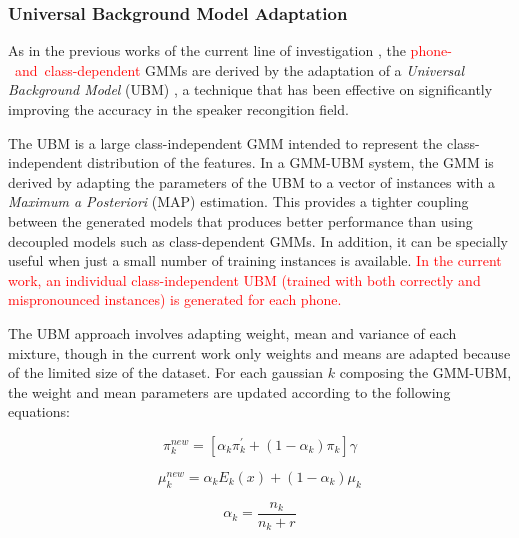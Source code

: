 
\subsubsection{Universal Background Model Adaptation} \label{subsubsection:ubm}

As in the previous works of the current line of investigation
\cite{detection_phone_level_mispronunciation_learning, main},
the \mbox{\textcolor{red}{phone- and class-dependent}} GMMs are derived by the adaptation of a
\textit{Universal Background Model} (UBM)
\cite{ubm_adaptation}, a technique that has been effective on significantly improving
the accuracy in the speaker recongition field.

The UBM is a large class-independent GMM intended to represent the class-independent distribution
of the features. In a GMM-UBM system, the GMM is derived by adapting the parameters of the UBM
to a vector of instances with a \textit{Maximum a Posteriori} (MAP) estimation. This provides a
tighter coupling between the generated models that produces better performance than using
decoupled models such as class-dependent GMMs. In addition, it can be specially useful when
just a small number of training instances is available.
\textcolor{red}{In the current work, an individual
class-independent UBM (trained with both correctly and mispronounced instances)
is generated for each phone.}

The UBM approach involves adapting weight, mean and variance of each
mixture, though in the current work only weights and means are adapted because of the limited
size of the dataset. For each gaussian $k$ composing the GMM-UBM, the weight and mean parameters
are updated according to the following equations:

\begin{equation}
  \pi_{k}^{new} = [\alpha_{k} \pi_{k}^{'} + (1-\alpha_{k}) \pi_{k}]\gamma
\end{equation}

\begin{equation}
  \mu_{k}^{new} = \alpha_{k} E_{k}(x) + (1-\alpha_{k})\mu_{k}
\end{equation}

\begin{equation}
  \alpha_{k} = \frac{n_{k}}{n_{k}+r}
\end{equation}


